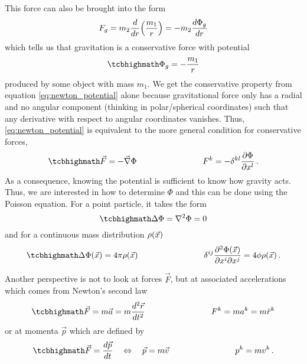 This force can also be brought into the form
\begin{equation}\label{eq:newton_potential}
F_g = m_2 \dv{r}\qty(\frac{m_1}{r}) = - m_2 \dv{\Phi_g}{r}
\end{equation}
which tells us that gravitation is a conservative force with potential 
\begin{equation}
\eqbox{
\Phi_g = - \frac{m_1}{r}
}
\end{equation}
produced by some object with mass $m_1$. We get the conservative property from equation \eqref{eq:newton_potential} alone because gravitational force only has a radial and no angular component (thinking in polar/spherical coordinates) such that any derivative with respect to angular coordinates %
 vanishes. Thus, \eqref{eq:newton_potential} is equivalent to the more general condition for conservative forces,
\begin{equation}\label{eq:cons_force}
\eqbox{
\vec{F} = - \vec{\nabla} \Phi
}
\manyqquad
F^k = - \delta^{k l} \pdv{\Phi}{x^l} \, .
\end{equation}
As a consequence, knowing the potential is sufficient to know how gravity acts. Thus, we are interested in how to determine $\Phi$ and this can be done using the Poisson equation. For a point particle, it takes the form
\begin{equation}
\eqbox{
\Delta \Phi = \nabla^2 \Phi = 0
}
\end{equation}
and for a continuous mass distribution $\rho\qty(\vec{x})$
\begin{equation}\label{eq:field_eq_newton}
\eqbox{
\Delta \Phi\qty(\vec{x}) = 4 \pi \rho\qty(\vec{x})
}
\manyqquad
\delta^{ij} \pdv[2]{\Phi(\vec{x})}{x^i}{x^j} = 4 \phi \rho\qty(\vec{x}) \, .
\end{equation}

Another perspective is not to look at forces $\vec{F}$, but at associated accelerations which comes from Newton's second law
\begin{equation}
\eqbox{
\vec{F} = m \vec{a} = m \dv[2]{\vec{r}}{t}
}
\manyqquad
F^k = m a^k = m \ddot{r}^k
\end{equation}
or at momenta $\vec{p}$ which are defined by
\begin{equation}
\eqbox{
\vec{F} = \dv{\vec{p}}{t} \quad \Leftrightarrow \quad \vec{p} = m \vec{v}
}
\manyqquad
p^k = m v^k \, .
\end{equation}



